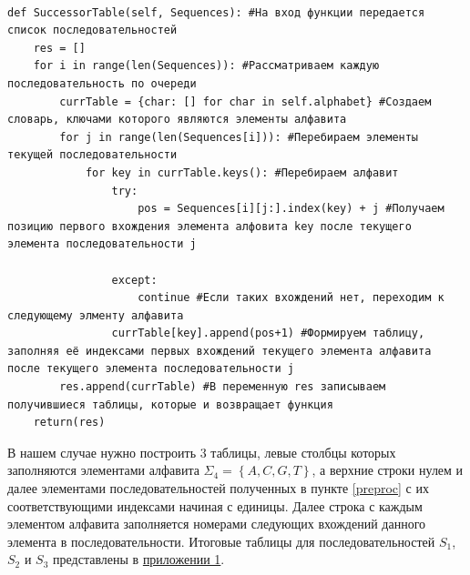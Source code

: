 \documentclass[a4paper,12pt]{extarticle}
\begin{document}
\begin{verbatim}

def SuccessorTable(self, Sequences): #На вход функции передается список последовательностей
    res = []
    for i in range(len(Sequences)): #Рассматриваем каждую последовательность по очереди
        currTable = {char: [] for char in self.alphabet} #Создаем словарь, ключами которого являются элементы алфавита
        for j in range(len(Sequences[i])): #Перебираем элементы текущей последовательности
            for key in currTable.keys(): #Перебираем алфавит
                try:
                    pos = Sequences[i][j:].index(key) + j #Получаем позицию первого вхождения элемента алфовита key после текущего элемента последовательности j

                except:
                    continue #Если таких вхождений нет, переходим к следующему элменту алфавита
                currTable[key].append(pos+1) #Формируем таблицу, заполняя её индексами первых вхождений текущего элемента алфавита после текущего элемента последовательности j
        res.append(currTable) #В переменную res записываем получившиеся таблицы, которые и возвращает функция
    return(res)

\end{verbatim}

В нашем случае нужно построить 3 таблицы, левые столбцы которых заполняются элементами алфавита $\Sigma_{4} = \left\{A, C, G, T\right\}$, а верхние строки нулем и далее элементами последовательностей полученных в пункте \ref{preproc} с их соответствующими индексами начиная с единицы. Далее строка с каждым элементом алфавита заполняется номерами следующих вхождений данного элемента в последовательности. Итоговые таблицы для последовательностей $S_{1}$, $S_{2}$ и $S_{3}$ представлены в \hyperref[table:1]{приложении 1}.
\end{document}
